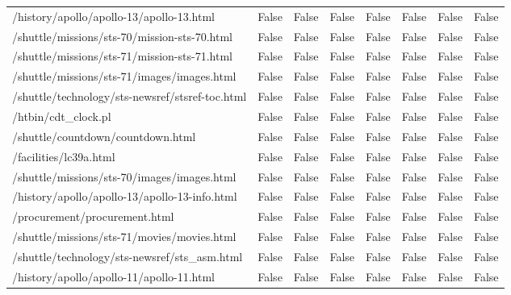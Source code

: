 \documentclass[../EDI_Task1_Karwowski_Kowalewski.tex]{subfiles}
\begin{document}
{{{\begin{table}[!htbp]
\begin{tabular}{|l|c|c|c|c|c|c|c|}
                    /history/apollo/apollo-13/apollo-13.html         &      False   &   False   &   False   &   False   &   False   &   False   &   False \\
                    /shuttle/missions/sts-70/mission-sts-70.html     &      False   &   False   &   False   &   False   &   False   &   False   &   False \\
                    /shuttle/missions/sts-71/mission-sts-71.html     &      False   &   False   &   False   &   False   &   False   &   False   &   False \\
                    /shuttle/missions/sts-71/images/images.html      &      False   &   False   &   False   &   False   &   False   &   False   &   False \\
                    /shuttle/technology/sts-newsref/stsref-toc.html  &      False   &   False   &   False   &   False   &   False   &   False   &   False \\
                    /htbin/cdt\_clock.pl                              &      False   &   False   &   False   &   False   &   False   &   False   &   False \\
                    /shuttle/countdown/countdown.html                &      False   &   False   &   False   &   False   &   False   &   False   &   False \\
                    /facilities/lc39a.html                           &      False   &   False   &   False   &   False   &   False   &   False   &   False \\
                    /shuttle/missions/sts-70/images/images.html      &      False   &   False   &   False   &   False   &   False   &   False   &   False \\
                    /history/apollo/apollo-13/apollo-13-info.html    &      False   &   False   &   False   &   False   &   False   &   False   &   False \\
                    /procurement/procurement.html                    &      False   &   False   &   False   &   False   &   False   &   False   &   False \\
                    /shuttle/missions/sts-71/movies/movies.html      &      False   &   False   &   False   &   False   &   False   &   False   &   False \\
                    /shuttle/technology/sts-newsref/sts\_asm.html     &      False   &   False   &   False   &   False   &   False   &   False   &   False \\
                    /history/apollo/apollo-11/apollo-11.html         &      False   &   False   &   False   &   False   &   False   &   False   &   False \\

\end{tabular}
\end{table}}}}
\end{document}
